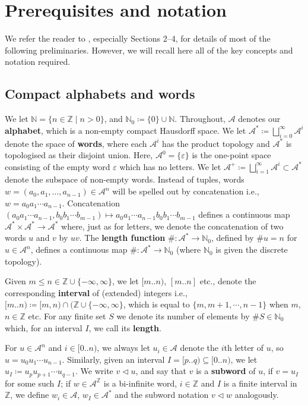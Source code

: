 \documentclass[11pt]{amsart}
\numberwithin{equation}{section}
\theoremstyle{plain}
\theoremstyle{definition}
\newcommand{\Z}{{\mathbb Z}}
\newcommand{\N}{{\mathbb N}}
\newcommand{\mc}{\mathcal}
\newcommand{\A}{\mc A}
\begin{document}
\section{Prerequisites and notation} \label{sec:prereqs}

We refer the reader to \cite{MRW25}, especially Sections 2--4, for details of most of the following preliminaries. However, we will recall here all of the key concepts and notation required.

\subsection{Compact alphabets and words}
We let \(\N = \{n \in \Z \mid n > 0\}\), and \(\N_0 \coloneqq \{0\} \cup \N\). Throughout, \(\A\) denotes our \textbf{alphabet}, which is a non-empty compact Hausdorff space. We let \(\A^\ast \coloneqq \bigsqcup_{i=0}^\infty \A^i\) denote the space of \textbf{words}, where each \(\A^i\) has the product topology and \(\A^\ast\) is topologised as their disjoint union. Here, \(\A^0 = \{ \varepsilon \}\) is the one-point space consisting of the empty word \(\varepsilon\) which has no letters. We let \(\A^+ \coloneqq \bigsqcup_{i=1}^\infty \A^i \subset \A^\ast\) denote the subspace of non-empty words. Instead of tuples, words \(w = (a_0,a_1,\ldots,a_{n-1}) \in \A^n\) will be spelled out by concatenation i.e., \(w = a_0 a_1 \cdots a_{n-1}\). Concatenation \((a_0 a_1 \cdots a_{n-1},b_0 b_1 \cdots b_{m-1}) \mapsto a_0 a_1 \cdots a_{n-1} b_0 b_1 \cdots b_{m-1}\) defines a continuous map \(\A^\ast \times \A^\ast \to \A^\ast\) where, just as for letters, we denote the concatenation of two words \(u\) and \(v\) by \(uv\). The \textbf{length function} \(\# \colon \A^\ast \to \N_0\), defined by \(\# u = n\) for \(u \in \A^n\), defines a continuous map \(\# \colon \A^\ast \to \N_0\) (where \(\N_0\) is given the discrete topology).

Given \(m \leq n \in \Z \cup \{-\infty,\infty\}\), we let \([m..n)\), \([m..n]\) etc., denote the corresponding \textbf{interval} of (extended) integers i.e., \([m..n) \coloneqq [m,n) \cap (\Z \cup \{-\infty,\infty\}\), which is equal to \(\{m,m+1,\cdots,n-1\}\) when \(m\), \(n \in \Z\) etc. For any finite set \(S\) we denote its number of elements by \(\# S \in \N_0\) which, for an interval \(I\), we call its \textbf{length}.

For \(u \in \A^n\) and \(i \in [0..n)\), we always let \(u_i \in \A\) denote the \(i\)th letter of \(u\), so \(u = u_0 u_1 \cdots u_{n-1}\). Similarly, given an interval \(I = [p..q) \subseteq [0..n)\), we let \(u_I \coloneqq u_p u_{p+1} \cdots u_{q-1}\). We write \(v \triangleleft u\), and say that \(v\) is a \textbf{subword} of \(u\), if \(v = u_I\) for some such \(I\); if \(w \in \A^{\Z}\) is a bi-infinite word, \(i \in \Z\) and \(I\) is a finite interval in \(\Z\), we define \(w_i \in \A\), \(w_I \in \A^\ast\) and the subword notation \(v \triangleleft w\) analogously.
\end{document}

